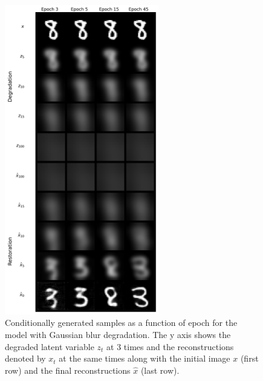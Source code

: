 \documentclass[11pt]{article}
\begin{document}
\begin{figure}[H]
    \centering
    \includegraphics[width=0.6\textwidth]{figs/q2b_blur_cond_samples_norm.png}
    \caption{Conditionally generated samples as a function of epoch for the model with Gaussian blur degradation. The y axis shows the degraded latent variable $z_t$ at 3 times and the reconstructions denoted by $x_t$ at the same times along with the initial image $x$ (first row) and the final reconstructions $\hat{x}$ (last row).}
    \label{fig:q2b_conditional_samples}
\end{figure}
\end{document}
